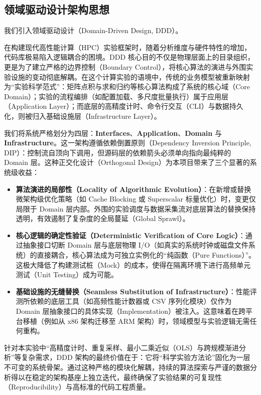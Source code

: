 \subsection{领域驱动设计架构思想}

我们引入领域驱动设计（Domain-Driven Design, DDD）。

在构建现代高性能计算（HPC）实验框架时，随着分析维度与硬件特性的增加，代码库极易陷入逻辑耦合的困境。DDD 核心目的不仅是物理层面上的目录组织，更是为了建立严格的边界控制（Boundary Control），将核心算法的演进与外围实验设施的变动彻底解耦。在这个计算实验的语境中，传统的业务模型被重新映射为“实验科学范式”：矩阵点积与求和归约等核心算法构成了系统的核心域（Core Domain）；实验的流程编排（如配置加载、多尺度批量执行）属于应用层（Application Layer）；而底层的高精度计时、命令行交互（CLI）与数据持久化，则被归入基础设施层（Infrastructure Layer）。

我们将系统严格划分为四层：\textbf{Interfaces}、\textbf{Application}、\textbf{Domain} 与 \textbf{Infrastructure}。这一架构遵循依赖倒置原则（Dependency Inversion Principle, DIP）：控制流自顶向下调用，但源码层的依赖箭头必须单向指向最纯粹的 Domain 层。这种正交化设计（Orthogonal Design）为本项目带来了三个显著的系统级收益：

\begin{itemize}
    \item \textbf{算法演进的局部性（Locality of Algorithmic Evolution）}：在新增或替换微架构级优化策略（如 Cache Blocking 或 Superscalar 标量优化）时，变更仅局限于 Domain 层内部。外围的实验调度与数据采集流对底层算法的替换保持透明，有效遏制了复杂度的全局蔓延（Global Sprawl）。
    \item \textbf{核心逻辑的确定性验证（Deterministic Verification of Core Logic）}：通过抽象接口切断 Domain 层与底层物理 I/O（如真实的系统时钟或磁盘文件系统）的直接耦合，核心算法成为可独立实例化的“纯函数（Pure Functions）”。这极大降低了构建测试桩（Mock）的成本，使得在隔离环境下进行高频单元测试（Unit Testing）成为可能。
    \item \textbf{基础设施的无缝替换（Seamless Substitution of Infrastructure）}：性能评测所依赖的底层工具（如高频性能计数器或 CSV 序列化模块）仅作为 Domain 层抽象接口的具体实现（Implementation）被注入。这意味着在跨平台移植（例如从 x86 架构迁移至 ARM 架构）时，领域模型与实验逻辑无需任何重构。
\end{itemize}

针对本实验中“高精度计时、重复采样、最小二乘近似（OLS）与跨规模渐进分析”等复杂需求，DDD 架构的最终价值在于：它将“科学实验方法论”固化为一层不可变的系统骨架。通过这种严格的模块化解耦，持续的算法探索与严谨的数据分析得以在稳定的架构基座上独立迭代，最终确保了实验结果的可复现性（Reproducibility）与高标准的代码工程质量。

